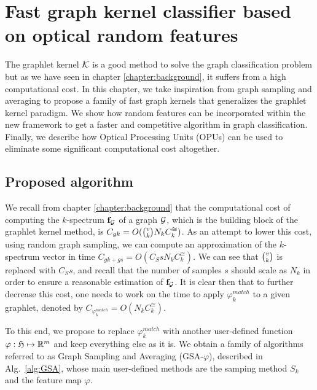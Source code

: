 \chapter{Fast graph kernel classifier based on optical random features }
\label{chapter:fast_algorithm}
\newtheorem{lemma}{Lemma} 
The graphlet kernel $\mathcal{K}$ is a good method to solve the graph classification problem but as we have seen in chapter \ref{chapter:background}, it suffers from a high computational cost. In this chapter, we take inspiration from graph sampling and averaging to propose a family of fast graph kernels that generalizes the graphlet kernel paradigm. We show how random features can be incorporated within the new framework to get a faster and competitive algorithm in graph classification. Finally, we describe how Optical Processing Units (OPUs) can be used to eliminate some significant computational cost altogether.

\section{Proposed algorithm}
We recall from chapter \ref{chapter:background} that the computational cost of computing the $k$-spectrum $\mathbf{f}_{\mathcal{G}}$ of a graph $\mathcal{G}$, which is the building block of the graphlet kernel method, is $C_{gk}= O(\tbinom{v}{k} N_k C_k^{\cong})$. As an attempt to lower this cost, using random graph sampling, we can compute an approximation of the $k$-spectrum vector in time $C_{gk + gs}= O(C_S s N_k C_k^{\cong})$. We can see that $\tbinom{v}{k}$ is replaced with $C_S s$, and recall that the number of samples $s$  should scale as $N_k$ in order to ensure a reasonable estimation of $\mathbf{f}_{\mathcal{G}}$. It is clear then that to further decrease this cost, one needs to work on the time to apply $\varphi_k^{match}$ to a given graphlet, denoted by $C_{\varphi_k^{match}}=O(N_k C_k^{\cong})$.

To this end, we propose to replace $\varphi^{match}_k$ with another user-defined function $\varphi:\mathfrak{H} \mapsto\mathbb{R}^m$ and keep everything else as it is. We obtain a family of algorithms referred to as Graph Sampling and Averaging (GSA-$\varphi$), described in Alg.~\ref{alg:GSA}, whose main user-defined methods are the samping method $S_k$ and the feature map $\varphi$.

